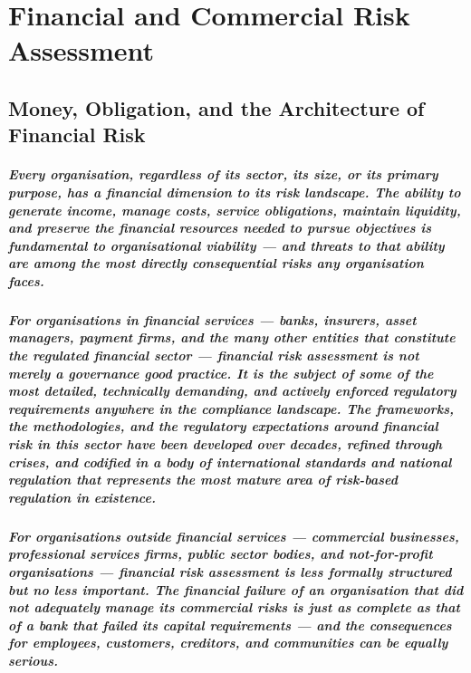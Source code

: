 \chapter{Financial and Commercial Risk Assessment}
\label{chap:Financial and Commercial Risk Assessment}

\section{Money, Obligation, and the Architecture of Financial Risk}
\paragraph{Every organisation, regardless of its sector, its size, or its primary purpose, has a financial dimension to its risk landscape. The ability to generate income, manage costs, service obligations, maintain liquidity, and preserve the financial resources needed to pursue objectives is fundamental to organisational viability — and threats to that ability are among the most directly consequential risks any organisation faces.}
\paragraph{For organisations in financial services — banks, insurers, asset managers, payment firms, and the many other entities that constitute the regulated financial sector — financial risk assessment is not merely a governance good practice. It is the subject of some of the most detailed, technically demanding, and actively enforced regulatory requirements anywhere in the compliance landscape. The frameworks, the methodologies, and the regulatory expectations around financial risk in this sector have been developed over decades, refined through crises, and codified in a body of international standards and national regulation that represents the most mature area of risk-based regulation in existence.}
\paragraph{For organisations outside financial services — commercial businesses, professional services firms, public sector bodies, and not-for-profit organisations — financial risk assessment is less formally structured but no less important. The financial failure of an organisation that did not adequately manage its commercial risks is just as complete as that of a bank that failed its capital requirements — and the consequences for employees, customers, creditors, and communities can be equally serious.}
